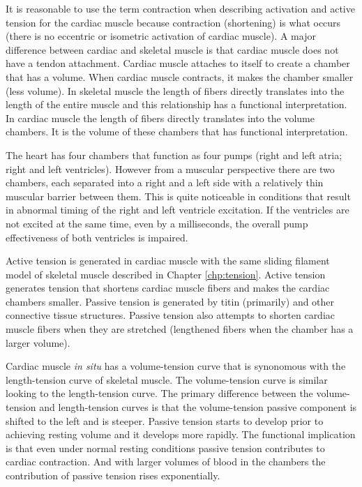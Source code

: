 It is reasonable to use the term contraction when describing activation and active tension for the cardiac muscle because contraction (shortening) is what occurs (there is no eccentric or isometric activation of cardiac muscle). A major difference between cardiac and skeletal muscle is that cardiac muscle does not have a tendon attachment. Cardiac muscle attaches to itself to create a chamber that has a volume. When cardiac muscle contracts, it makes the chamber smaller (less volume). In skeletal muscle the length of fibers directly translates into the length of the entire muscle and this relationship has a functional interpretation. In cardiac muscle the length of fibers directly translates into the volume chambers. It is the volume of these chambers that has functional interpretation. 

The heart has four chambers that function as four pumps (right and left atria; right and left ventricles). However from a muscular perspective there are two chambers, each separated into a right and a left side with a relatively thin muscular barrier between them. This is quite noticeable in conditions that result in abnormal timing of the right and left ventricle excitation. If the ventricles are not excited at the same time, even by a milliseconds, the overall pump effectiveness of both ventricles is impaired.

Active tension is generated in cardiac muscle with the same sliding filament model of skeletal muscle described in Chapter \ref{chp:tension}. Active tension generates tension that shortens cardiac muscle fibers and makes the cardiac chambers smaller. Passive tension is generated by titin (primarily) and other connective tissue structures. Passive tension also attempts to shorten cardiac muscle fibers when they are stretched (lengthened fibers when the chamber has a larger volume). 

Cardiac muscle \textit{in situ} has a volume-tension curve that is synonomous with the length-tension curve of skeletal muscle. The volume-tension curve is similar looking to the length-tension curve. The primary difference between the volume-tension and length-tension curves is that the volume-tension passive component is shifted to the left and is steeper. Passive tension starts to develop prior to achieving resting volume and it develops more rapidly. The functional implication is that even under normal resting conditions passive tension contributes to cardiac contraction. And with larger volumes of blood in the chambers the contribution of passive tension rises exponentially.


